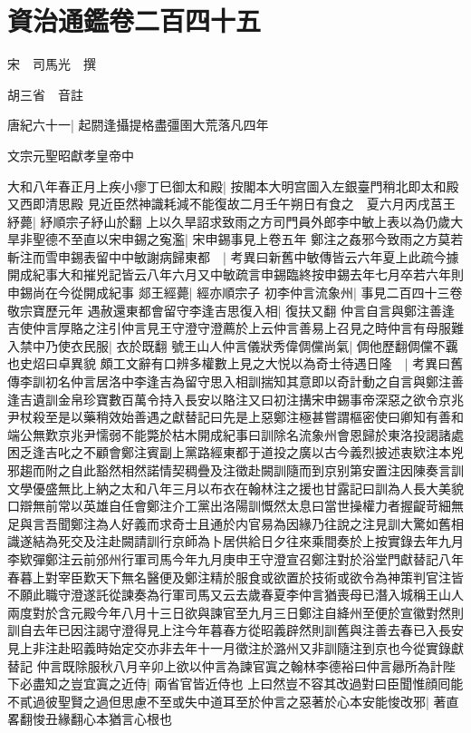 \chapter{資治通鑑卷二百四十五}
宋　司馬光　撰

胡三省　音註

唐紀六十一|{
	起閼逢攝提格盡彊圉大荒落凡四年}


文宗元聖昭獻孝皇帝中

大和八年春正月上疾小瘳丁巳御太和殿|{
	按閣本大明宫圖入左銀臺門稍北即太和殿又西即清思殿}
見近臣然神識耗減不能復故二月壬午朔日有食之　夏六月丙戌莒王紓薨|{
	紓順宗子紓山於翻}
上以久旱詔求致雨之方司門員外郎李中敏上表以為仍歲大旱非聖德不至直以宋申錫之寃濫|{
	宋申錫事見上卷五年}
鄭注之姦邪今致雨之方莫若斬注而雪申錫表留中中敏謝病歸東都　|{
	考異曰新舊中敏傳皆云六年夏上此疏今據開成紀事大和摧兇記皆云八年六月又中敏疏言申錫臨終按申錫去年七月卒若六年則申錫尚在今從開成紀事}
郯王經薨|{
	經亦順宗子}
初李仲言流象州|{
	事見二百四十三卷敬宗寶歷元年}
遇赦還東都會留守李逢吉思復入相|{
	復扶又翻}
仲言自言與鄭注善逢吉使仲言厚賂之注引仲言見王守澄守澄薦於上云仲言善易上召見之時仲言有母服難入禁中乃使衣民服|{
	衣於既翻}
號王山人仲言儀狀秀偉倜儻尚氣|{
	倜他歷翻倜儻不覊也史炤曰卓異貌}
頗工文辭有口辨多權數上見之大悦以為奇士待遇日隆　|{
	考異曰舊傳李訓初名仲言居洛中李逢吉為留守思入相訓揣知其意即以奇計動之自言與鄭注善逢吉遺訓金帛珍寶數百萬令持入長安以賂注又曰初注搆宋申錫事帝深惡之欲令京兆尹杖殺至是以藥稍效始善遇之獻替記曰先是上惡鄭注極甚嘗謂樞密使曰卿知有善和端公無歎京兆尹懦弱不能斃於枯木開成紀事曰訓除名流象州會恩歸於東洛投謁諸處困乏逢吉叱之不顧會鄭注賓副上黨路經東都于道投之廣以古今義烈披述衷欵注本兇邪趨而附之自此豁然相然諾情契稠疊及注徵赴闕訓隨而到京别第安置注因陳奏言訓文學優盛無比上納之太和八年三月以布衣在翰林注之援也甘露記曰訓為人長大美貌口辯無前常以英雄自任會鄭注介工黨出洛陽訓慨然太息曰當世操權力者握齪苛細無足與言吾聞鄭注為人好義而求奇士且通於内官易為因緣乃往說之注見訓大驚如舊相識遂結為死交及注赴闕請訓行京師為卜居供給日夕往來乘間奏於上按實錄去年九月李欵彈鄭注云前邠州行軍司馬今年九月庚申王守澄宣召鄭注對於浴堂門獻替記八年春暮上對宰臣歎天下無名醫便及鄭注精於服食或欲置於技術或欲令為神策判官注皆不願此職守澄遂託從諫奏為行軍司馬又云去歲春夏李仲言猶喪母已潛入城稱王山人兩度對於含元殿今年八月十三日欲與諫官至九月三日鄭注自絳州至便於宣徽對然則訓自去年已因注謁守澄得見上注今年暮春方從昭義辟然則訓舊與注善去春已入長安見上非注赴昭義時始定交亦非去年十一月徵注於潞州又非訓隨注到京也今從實錄獻替記}
仲言既除服秋八月辛卯上欲以仲言為諫官寘之翰林李德裕曰仲言曏所為計陛下必盡知之豈宜寘之近侍|{
	兩省官皆近侍也}
上曰然豈不容其改過對曰臣聞惟顔囘能不貳過彼聖賢之過但思慮不至或失中道耳至於仲言之惡著於心本安能悛改邪|{
	著直畧翻悛丑緣翻心本猶言心根也}
